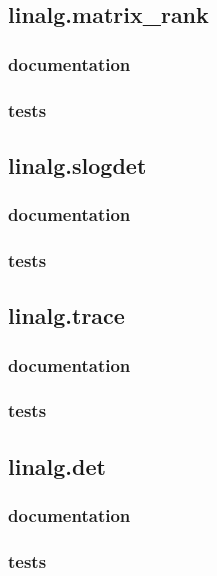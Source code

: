\documentclass[a4paper,11pt]{article}
\begin{document}
\subsection{linalg.matrix\_rank}

\subsubsection{documentation}
\subsubsection{tests}
\subsection{linalg.slogdet}
    
\subsubsection{documentation}
\subsubsection{tests}
\subsection{linalg.trace}

\subsubsection{documentation}
\subsubsection{tests}
\subsection{linalg.det}

\subsubsection{documentation}
\subsubsection{tests}
\end{document}

